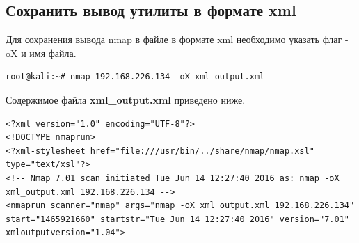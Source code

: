 \documentclass[10pt,a4paper,titlepage]{article}
\begin{document}
\subsection{Сохранить вывод утилиты в формате xml}
Для сохранения вывода nmap в файле в формате xml необходимо указать флаг -oX и имя файла.
\begin{verbatim}
root@kali:~# nmap 192.168.226.134 -oX xml_output.xml
\end{verbatim}
Содержимое файла \textbf{xml\_output.xml} приведено ниже.
\begin{verbatim}
<?xml version="1.0" encoding="UTF-8"?>
<!DOCTYPE nmaprun>
<?xml-stylesheet href="file:///usr/bin/../share/nmap/nmap.xsl" type="text/xsl"?>
<!-- Nmap 7.01 scan initiated Tue Jun 14 12:27:40 2016 as: nmap -oX xml_output.xml 192.168.226.134 -->
<nmaprun scanner="nmap" args="nmap -oX xml_output.xml 192.168.226.134" start="1465921660" startstr="Tue Jun 14 12:27:40 2016" version="7.01" xmloutputversion="1.04">

\end{verbatim}
\end{document}
